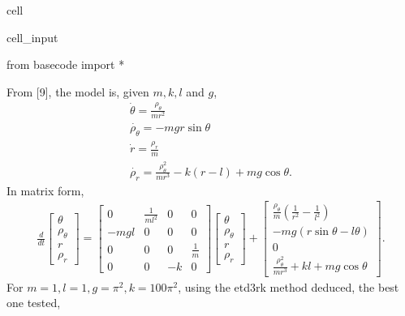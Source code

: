 \documentclass[letterpaper,10pt,english]{jupyterBook}
\begin{document}
\begin{sphinxuseclass}{cell}\begin{sphinxVerbatimInput}

\begin{sphinxuseclass}{cell_input}
\begin{sphinxVerbatim}[commandchars=\\\{\}]
from basecode import *
\end{sphinxVerbatim}

\end{sphinxuseclass}\end{sphinxVerbatimInput}

\end{sphinxuseclass}
\sphinxAtStartPar
From {[}9{]}, the model is, given \(m, k, l\) and \(g\),
\begin{equation*}
\begin{split}
  \dot{\theta} = \frac{\rho_\theta}{mr^2}\\
  \dot{\rho_\theta} = -mgr \sin{\theta}\\
  \dot{r} = \frac{\rho_r}{m} \\
  \dot{\rho_r} = \frac{\rho^2_\theta}{mr^3} - k(r - l) + mg \cos{\theta}.
\end{split}
\end{equation*}
\sphinxAtStartPar
In matrix form,
\begin{equation*}
\begin{split}
  \frac{d}{dt}\begin{bmatrix}
              \theta\\
              \rho_\theta\\
              r\\
              \rho_r
              \end{bmatrix}
  =
  \begin{bmatrix}
  0 & \frac{1}{ml^2} & 0 & 0\\
  -mgl & 0 & 0 & 0\\
  0 & 0 & 0 & \frac{1}{m}\\
  0 & 0 & -k & 0
  \end{bmatrix}
  \begin{bmatrix}
  \theta\\
  \rho_\theta\\
  r\\
  \rho_r
  \end{bmatrix}
  +
  \begin{bmatrix}
  \frac{\rho_\theta}{m} \left(\frac{1}{r^2}-\frac{1}{l^2}\right)\\
  -mg(r\sin{\theta}-l\theta)\\
  0\\
  \frac{\rho^2_\theta}{mr^3} + kl + mg \cos{\theta}
  \end{bmatrix}.
\end{split}
\end{equation*}
\sphinxAtStartPar
For \(m = 1, l = 1, g = \pi^2, k = 100 \pi^2\), using the etd3rk method deduced, the best one tested,
\end{document}
